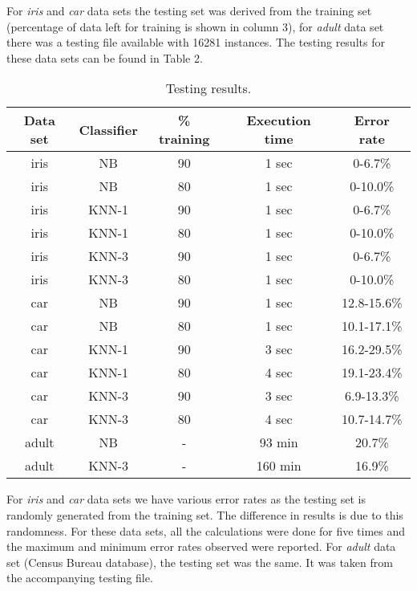 \documentclass{llncs}
\begin{document}
For \emph{iris} and \emph{car} data sets the testing set was derived from the training set (percentage of data left for training is shown in column 3), for \emph{adult} data set there was a testing file available with 16281 instances. The testing results for these data sets can be found in Table 2. 

\begin{table}
\begin{center}
  \begin{tabular}{ | c | c | c | c | c |}
    \hline
    \textbf{Data set} & \textbf{Classifier} & \textbf{\% training} & \textbf{Execution time} & \textbf{Error rate}\\ \hline
    iris & NB & 90 & 1 sec & 0-6.7\% \\ \hline
    iris & NB & 80 & 1 sec & 0-10.0\% \\ \hline
    iris & KNN-1 & 90 & 1 sec & 0-6.7\% \\ \hline
    iris & KNN-1 & 80 & 1 sec & 0-10.0\% \\ \hline
    iris & KNN-3 & 90 & 1 sec & 0-6.7\% \\ \hline
    iris & KNN-3 & 80 & 1 sec & 0-10.0\% \\ \hline
    car & NB & 90 & 1 sec & 12.8-15.6\% \\ \hline
    car & NB & 80 & 1 sec & 10.1-17.1\% \\ \hline
    car & KNN-1 & 90 & 3 sec & 16.2-29.5\% \\ \hline
    car & KNN-1 & 80 & 4 sec & 19.1-23.4\% \\ \hline
    car & KNN-3 & 90 & 3 sec & 6.9-13.3\% \\ \hline
    car & KNN-3 & 80 & 4 sec & 10.7-14.7\% \\ \hline
	adult & NB & - & 93 min & 20.7\% \\ \hline
    adult & KNN-3 & - & 160 min & 16.9\% \\
    \hline
  \end{tabular}
  \caption{Testing results.}
\end{center}
\end{table}

For \emph{iris} and \emph{car} data sets we have various error rates as the testing set is randomly generated from the training set. The difference in results is due to this randomness. For these data sets, all the calculations were done for five times and the maximum and minimum error rates observed were reported. For \emph{adult} data set (Census Bureau database), the testing set was the same. It was taken from the accompanying testing file.
\end{document}

